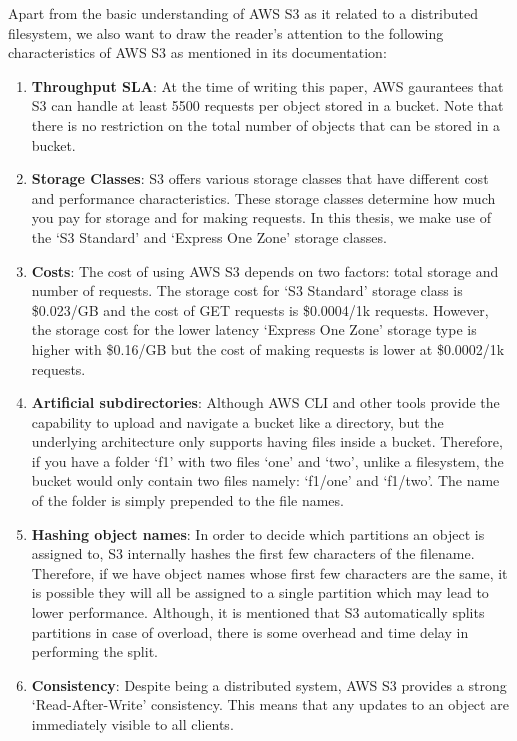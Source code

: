 \medskip
Apart from the basic understanding of AWS S3 as it related to a distributed
filesystem, we also want to draw the reader's attention to the following
characteristics of AWS S3 as mentioned in its documentation:
\begin{enumerate}
    \item \textbf{Throughput SLA}: At the time of writing this paper, AWS
        gaurantees that S3 can handle at least 5500 requests per object stored
        in a bucket. Note that there is no restriction on the total number of
        objects that can be stored in a bucket.
    \item \textbf{Storage Classes}: S3 offers various storage classes that have
        different cost and performance characteristics. These storage classes
        determine how much you pay for storage and for making requests. In this
        thesis, we make use of the `S3 Standard' and `Express One Zone' storage
        classes.
    \item \textbf{Costs}: The cost of using AWS S3 depends on two factors: total
        storage and number of requests. The storage cost for `S3 Standard'
        storage class is \$0.023/GB and the cost of GET requests is
        \$0.0004/1k requests. However, the storage cost for the lower latency
        `Express One Zone' storage type is higher with \$0.16/GB but the cost of making
        requests is lower at \$0.0002/1k requests. 
    \item \textbf{Artificial subdirectories}: Although AWS CLI and other tools
        provide the capability to upload and navigate a bucket like a directory,
        but the underlying architecture only supports having files inside a
        bucket. Therefore, if you have a folder `f1' with two files `one' and
        `two', unlike a filesystem, the bucket would only contain two files
        namely: `f1/one' and `f1/two'. The name of the folder is simply
        prepended to the file names.
    \item \textbf{Hashing object names}: In order to decide which partitions an
        object is assigned to, S3 internally hashes the first few characters of
        the filename. Therefore, if we have object names whose first few
        characters are the same, it is possible they will all be assigned to a
        single partition which may lead to lower performance. Although, it is
        mentioned that S3 automatically splits partitions in case of overload,
        there is some overhead and time delay in performing the split.
    \item \textbf{Consistency}: Despite being a distributed system, AWS S3
        provides a strong `Read-After-Write' consistency. This means that any
        updates to an object are immediately visible to all clients.
\end{enumerate}

